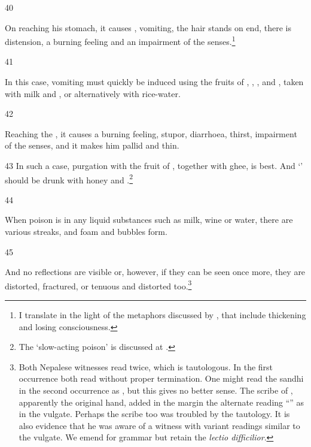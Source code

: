 \begin{translation}
     \item[40]
     
     On reaching his stomach, it causes , vomiting, the hair
stands on end, there is distension, a burning feeling and an impairment of
the senses.\footnote{I translate  in the light of the metaphors
discussed by \citet{meul-2011}, that include thickening and losing
consciousness.}

     \item[41] 
     
In this case, vomiting must quickly be induced using the fruits of
, %
, %
, %
and , %
taken with milk and , or alternatively with
rice-water.
     
     \item[42]
     
    
 Reaching the , it causes a burning feeling, stupor,
diarrhoea, thirst, impairment of the senses,  and it makes
him pallid and thin.
    
    
      \item [43]
In such a case, purgation with the fruit of , 
together with ghee, is best.  And  `'
should be drunk with honey and .\footnote{The `slow-acting
poison' is discussed at .}
     
     \item[44]
     
     When poison is in any liquid substances such as milk, wine or water, there are
     various streaks, and foam and bubbles form.  

     \item[45]
     
      And no reflections are visible or,
however, if they can be seen once more, they are distorted, fractured, or
tenuous and distorted too.\footnote{Both Nepalese witnesses read
 twice, which is tautologous.  In the first occurrence
both read  without proper termination.  One might read the sandhi
in the second occurrence as , but this gives
no better sense. The scribe of , apparently the
original hand,  added in the margin the alternate reading
“” as in the vulgate. Perhaps the scribe too was troubled
by the tautology.  It is also evidence that he was aware of a witness with
variant readings similar to the vulgate. We emend for grammar but retain the
\emph{lectio difficilior}.} 
     

\end{translation}
